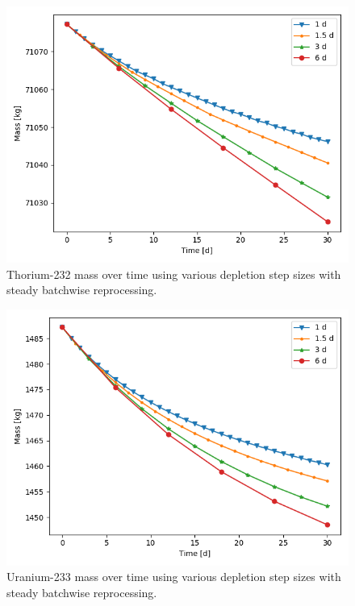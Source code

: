 \begin{figure}[H]
  \centering
  \includegraphics[scale=0.7]{images/Th232_sp_comp.png}
  \caption{Thorium-232 mass over time using various depletion step sizes with steady batchwise reprocessing.}
   \label{fig:steady-batch-th}
\end{figure}

\begin{figure}[H]
  \centering
  \includegraphics[scale=0.7]{images/U233_sp_comp.png}
  \caption{Uranium-233 mass over time using various depletion step sizes with steady batchwise reprocessing.}
   \label{fig:steady-batch-u}
\end{figure}

